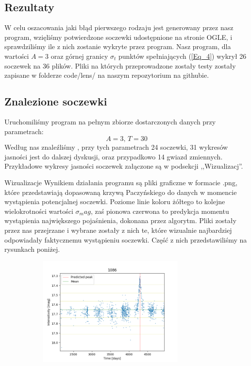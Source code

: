 \documentclass[a4paper,11pt]{article}
\newcommand{\ak}{\hspace{0.7 cm}}
\begin{document}
\begin{enumerate}
\begin{enumerate}
\section{Rezultaty}
		\ak W celu oszacowania jaki błąd pierwszego rodzaju jest generowany przez nasz program, wzięliśmy potwierdzone soczewki udostępnione na stronie OGLE, i sprawdziliśmy ile z nich zostanie wykryte przez program. Nasz program, dla wartości $A = 3$ oraz górnej granicy $\sigma_t$ punktów spełniających (\ref{Eq_4}) wykrył 26 soczewek na 36 plików. Pliki na których przeprowadzone zostały testy zostały zapisane w folderze code/lens/ na naszym repozytorium na githubie.
\subsection{Znalezione soczewki}
\ak Uruchomiliśmy program na pełnym zbiorze dostarczonych danych przy parametrach: 
$$A=3\textrm{, } T=30$$
\ak Według nas znaleźliśmy , przy tych parametrach 24 soczewki, 31 wykresów jasności jest do dalszej dyskusji, oraz przypadkowo 14 gwiazd zmiennych. Przykładowe wykresy jasności soczewek załączone są w podsekcji ,,Wizualizacj''. 
\begin{subsection}{Wizualizacje}
	\ak Wynikiem działania programu są pliki graficzne w formacie .png, które przedstawiają dopasowaną krzywą Paczyńskiego do danych w momencie wystąpienia potencjalnej soczewki. Poziome linie koloru żółtego to kolejne wielokrotności wartości $\sigma_mag$, zaś pionowa czerwona to predykcja momentu wystąpienia największego pojaśnienia, dokonana przez algorytm. Pliki zostały przez nas przejrzane i wybrane zostały z nich te, które wizualnie najbardziej odpowiadały faktycznemu wystąpieniu soczewki. Część z nich przedstawiliśmy na rysunkach poniżej.
\begin{figure}[H]
\begin{subfigure}{0.5\textwidth}
\centering
\includegraphics[width=\linewidth,height=5.5cm]{1086.png}
\label{Fig_4}
\end{subfigure}

\end{figure}
\end{subsection}
\end{enumerate}
\end{enumerate}
\end{document}
